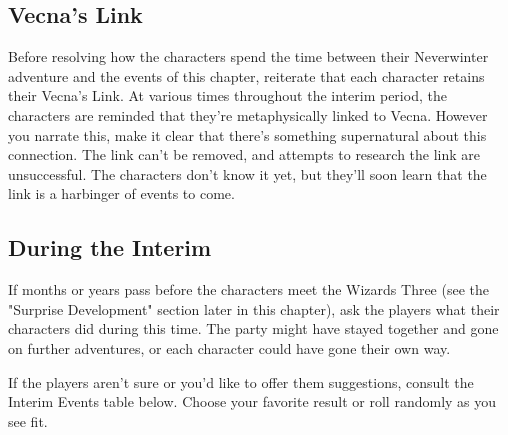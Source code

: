 \documentclass[10pt,a4paper,twoside,bg=print,twocolumn,openany,nodeprecatedcode]{dndbook}
\begin{document}
\subsection{Vecna's Link}
Before resolving how the characters spend the time between their Neverwinter adventure and the events of this chapter, reiterate that each character retains their Vecna's Link. At various times throughout the interim period, the characters are reminded that they're metaphysically linked to Vecna. However you narrate this, make it clear that there's something supernatural about this connection. The link can't be removed, and attempts to research the link are unsuccessful. The characters don't know it yet, but they'll soon learn that the link is a harbinger of events to come.

\subsection{During the Interim}
If months or years pass before the characters meet the Wizards Three (see the "Surprise Development" section later in this chapter), ask the players what their characters did during this time. The party might have stayed together and gone on further adventures, or each character could have gone their own way.

If the players aren't sure or you'd like to offer them suggestions, consult the Interim Events table below. Choose your favorite result or roll randomly as you see fit.
\end{document}
